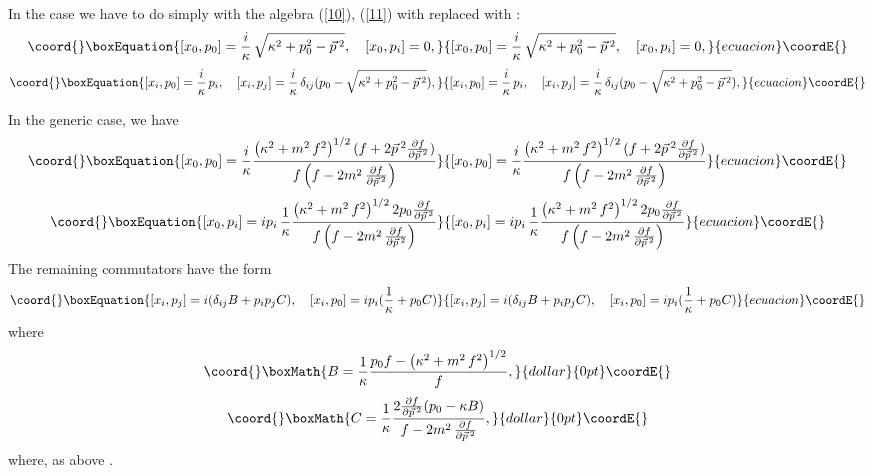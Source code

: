 \documentclass  [12pt] {article}
\def\vp{\vec{p}\, {}^2}
\begin{document}
In the case \coordHE{} we have to do simply with the algebra (\ref{10}), (\ref{11})
with \coordHE{} replaced with \myHighlight{$\sqrt{\kappa^2 +p_0^2-\vp}$}\coordHE{}:
\begin{equation}\coord{}\boxEquation{\label{a.3}
   [x_0,p_0] = \frac{i}\kappa\, \sqrt{\kappa^2 +p_0^2-\vp}, \quad [x_0,p_i] = 0,
}{[x_0,p_0] = \frac{i}\kappa\, \sqrt{\kappa^2 +p_0^2-\vp}, \quad [x_0,p_i] = 0,
}{ecuacion}\coordE{}\end{equation}
\begin{equation}\coord{}\boxEquation{\label{a.4}
   [x_i, p_0] =\frac{i}\kappa\, p_i, \quad [x_i, p_j] = \frac{i}\kappa\,
\delta_{ij}(p_0 - \sqrt{\kappa^2 +p_0^2-\vp}),
}{[x_i, p_0] =\frac{i}\kappa\, p_i, \quad [x_i, p_j] = \frac{i}\kappa\,
\delta_{ij}(p_0 - \sqrt{\kappa^2 +p_0^2-\vp}),
}{ecuacion}\coordE{}\end{equation}

In the generic case, we have
\begin{equation}\coord{}\boxEquation{\label{a.5}
 [x_{0},p_{0}]=\frac{i}{\kappa}\frac{\left(\kappa^{2}+m^2\, f^{2}\right)^{1/2}
 (f+2\vp\frac{\partial f}{\partial \vp})}{f\left(f-2m^2\,
 \frac{\partial f}{\partial \vp}\right)}
}{[x_{0},p_{0}]=\frac{i}{\kappa}\frac{\left(\kappa^{2}+m^2\, f^{2}\right)^{1/2}
 (f+2\vp\frac{\partial f}{\partial \vp})}{f\left(f-2m^2\,
 \frac{\partial f}{\partial \vp}\right)}
}{ecuacion}\coordE{}\end{equation}
\begin{equation}\coord{}\boxEquation{\label{a.6}
 [x_0, p_i] = i p_i\, \frac{1}{\kappa}\frac{\left(\kappa^{2}+m^2\, f^{2}\right)^{1/2}
 2p_{0}\frac{\partial f}{\partial \vp}}{f\left(f-2m^2\,
 \frac{\partial f}{\partial \vp}\right)}
}{[x_0, p_i] = i p_i\, \frac{1}{\kappa}\frac{\left(\kappa^{2}+m^2\, f^{2}\right)^{1/2}
 2p_{0}\frac{\partial f}{\partial \vp}}{f\left(f-2m^2\,
 \frac{\partial f}{\partial \vp}\right)}
}{ecuacion}\coordE{}\end{equation}
The remaining commutators have the form
\begin{equation}\coord{}\boxEquation{\label{a.7}
 [x_{i},p_{j}]=i(\delta_{ij}B+p_{i}p_{j}C), \quad [x_{i},p_{0}]=ip_{i}(\frac{1}{\kappa}+p_{0}C)
}{[x_{i},p_{j}]=i(\delta_{ij}B+p_{i}p_{j}C), \quad [x_{i},p_{0}]=ip_{i}(\frac{1}{\kappa}+p_{0}C)
}{ecuacion}\coordE{}\end{equation}
where
$$\coord{}\boxMath{
 B=\frac{1}{\kappa}\frac{p_{0}f-
 \left(\kappa^{2}+m^2\, f^{2}\right)^{1/2}}{f},
}{dollar}{0pt}\coordE{}$$  $$\coord{}\boxMath{
 C=\frac{1}{\kappa}\frac{2\frac{\partial f}{\partial \vp}(p_{0}-\kappa B)}
 {f-2m^2\, \frac{\partial f}{\partial \vp}},
}{dollar}{0pt}\coordE{}$$
where, as above \myHighlight{$m^2 \equiv p_{0}^{2}-\vp$}\coordHE{}.
\end{document}

